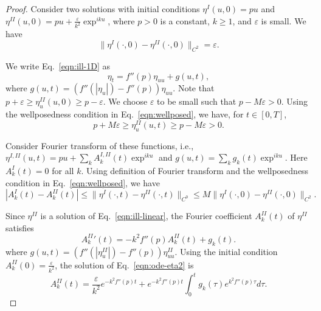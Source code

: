 \begin{proof}
Consider two solutions with initial conditions $\eta^I(u,0)=pu$ and
$\eta^{II}(u,0)=pu+\frac{\varepsilon}{k^2} \exp^{iku}$, where $p>0$ is a constant, $k\geq1$, and $\varepsilon$ is small. We have %
\begin{equation}\label{eqn:contradic2}
\|\eta^I(\cdot,0)-\eta^{II}(\cdot,0)\|_{C^2}=\varepsilon.
\end{equation}

We write Eq.~\eqref{eqn:ill-1D} as
\begin{equation}\label{eqn:ill-linear}
\eta_t=f''(p)\eta_{uu}+g(u,t),
\end{equation}
where $g(u,t)=(f''(|\eta_u|)-f''(p))\eta_{uu}$. %
Note that $p+\varepsilon\geq \eta^{II}_u(u,0)\geq p-\varepsilon$. We choose $\varepsilon$ to be small such that $p-M\varepsilon>0$. Using the wellposedness condition in Eq.~\eqref{eqn:wellposed}, we have, for $t\in [0,T]$,
\begin{equation}\label{eqn:eta-bounds}
p+M\varepsilon\geq \eta^{II}_u(u,t)\geq p-M\varepsilon>0.
\end{equation}


Consider Fourier transform of these functions, i.e., $\eta^{I,II}(u,t)=pu+\sum_k A_k^{I,II}(t)\exp^{iku}$ and $g(u,t)=\sum_k g_k(t)\exp^{iku}$. Here $A_k^{I}(t)=0$ for all $k$. Using definition of Fourier transform and the wellposedness condition in Eq.~\eqref{eqn:wellposed}, we have
\begin{equation}\label{eqn:well-k}
|A^I_k(t)-A^{II}_k(t)|\leq \|\eta^I(\cdot,t)-\eta^{II}(\cdot,t)\|_{C^0} \leq M \|\eta^I(\cdot,0)-\eta^{II}(\cdot,0)\|_{C^2}.
\end{equation}

 Since $\eta^{II}$ is a solution of Eq.~\eqref{eqn:ill-linear}, the Fourier coefficient  $A^{II}_k(t)$ of $\eta^{II}$ satisfies
\begin{equation}\label{eqn:ode-eta2}
{A^{II}_k}'(t)=-k^2f''(p)A^{II}_k(t)+g_k(t).
\end{equation}
where $g(u,t)=(f''(|\eta^{II}_u|)-f''(p))\eta^{II}_{uu}$.
Using the initial condition ${A^{II}_k}(0)=\frac{\varepsilon}{k^2}$, the solution of Eq.~\eqref{eqn:ode-eta2} is
\begin{equation}\label{eqn:AII}
A^{II}_k(t)=\frac{\varepsilon}{k^2} e^{-k^2f''(p)t}+e^{-k^2f''(p)t}\int_0^tg_k(\tau)e^{k^2f''(p)\tau} d\tau.
\end{equation}




\end{proof}
